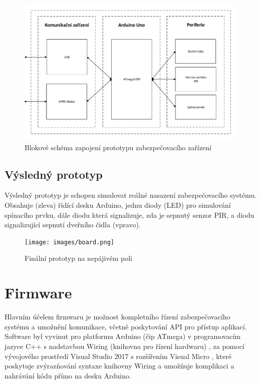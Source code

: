 \documentclass[FM,DP]{tulthesis}  %
\begin{document}
\begin{figure}[H]
\begin{center}
\includegraphics[width=\textwidth]{vector/blokoveSchemaHardware.pdf}
\caption{Blokové schéma zapojení prototypu zabezpečovacího zařízení}
\label{image}
\end{center}
\end{figure}

\subsection{Výsledný prototyp}
Výsledný prototyp je schopen simulovat reálné nasazení zabezpečovacího systému. Obsahuje (zleva) řídící desku Arduino, jednu diody (LED) pro simulování spínacího prvku, dále diodu která signalizuje, zda je sepnutý senzor PIR, a diodu signalizující sepnutí dveřního čidla (vpravo). 

\begin{figure}[H]
\begin{center}
\texttt{[image: images/board.png]}
\caption{Finální prototyp na nepájivém poli}
\label{image}
\end{center}
\end{figure}

\section{Firmware}
Hlavním účelem firmwaru je možnost kompletního řízení zabezpečovacího systému a umožnění komunikace, včetně poskytování API pro přístup aplikací. Software byl vyvinut pro platformu Arduino (čip ATmega) v programovacím jazyce C++ s nadstavbou Wiring (knihovna pro řízení hardwaru) \cite{Wiring}, za pomocí vývojového prostředí Visual Studio 2017 s rozšířením Visual Micro \cite{Visual Micro}, které poskytuje zvýrazňování syntaxe knihovny Wiring a umožňuje komplikaci a nahrávání kódu přímo na desku Arduino.
\end{document}
